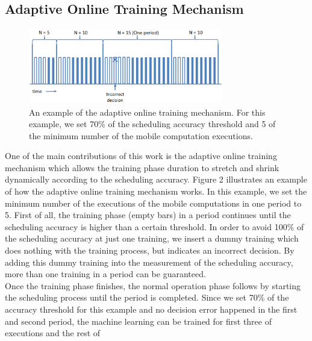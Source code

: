\documentclass[10pt, conference, compsocconf]{IEEEtran}
\begin{document}
{\subsection{Adaptive Online Training Mechanism}
%
\begin{figure}
\centering
\includegraphics[height=3.3cm, width=8.5cm]{Figure/figure2}
\caption{An example of the adaptive online training mechanism. For this
example, we set 70\% of the scheduling accuracy threshold and 5 of the
minimum number of the mobile computation executions.}
\end{figure}
%
One of the main contributions of this work is the adaptive online
training mechanism which allows the training phase duration to stretch and shrink
dynamically according to the scheduling accuracy.
Figure 2 illustrates an example of how the adaptive online training
mechanism works.
%
In this example, we set the minimum number of the executions of the
mobile computations in one period to 5.
%
First of all, the training phase (empty bars) in a period
continues until the scheduling accuracy is higher than a certain
threshold.
In order to avoid 100\% of the scheduling accuracy at just one training,
we insert a dummy training which does nothing with the training process,
but indicates an incorrect decision. 
%
By adding this dummy training into the measurement of the scheduling
accuracy, more than one training in a period can be guaranteed.\\
%
\indent Once the training phase finishes, the normal operation phase
follows by starting the scheduling process until the period is
completed.
Since we set 70\% of the accuracy threshold for this example and no
decision error happened in the first and second period, the machine
learning can be trained for first three of executions and the rest of
}
\end{document}
